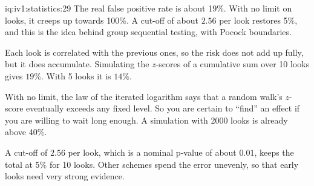 \begin{solution}{iq:iv1:statistics:29}
The real false positive rate is about 19\%. With no limit on looks, it creeps up towards 100\%. A cut-off of about $2.56$ per look restores 5\%, and this is the idea behind group sequential testing, with Pocock boundaries.

Each look is correlated with the previous ones, so the risk does not add up fully, but it does accumulate. Simulating the $z$-scores of a cumulative sum over 10 looks gives $19\%$. With 5 looks it is $14\%$.

With no limit, the law of the iterated logarithm says that a random walk's $z$-score eventually exceeds any fixed level. So you are certain to ``find'' an effect if you are willing to wait long enough. A simulation with 2000 looks is already above 40\%.

A cut-off of $2.56$ per look, which is a nominal p-value of about $0.01$, keeps the total at 5\% for 10 looks. Other schemes spend the error unevenly, so that early looks need very strong evidence.

\end{solution}

